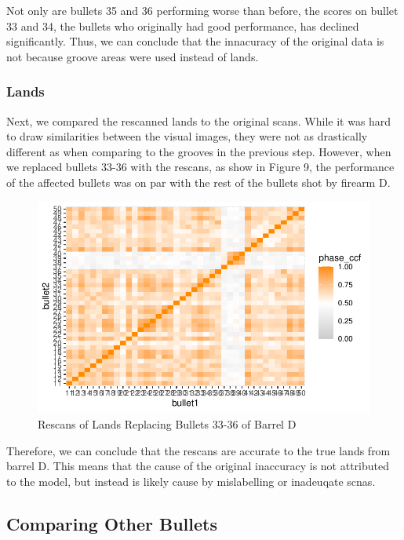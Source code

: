 \documentclass[
  number]{elsarticle}
\begin{document}
Not only are bullets 35 and 36 performing worse than before, the scores
on bullet 33 and 34, the bullets who originally had good performance,
has declined significantly. Thus, we can conclude that the innacuracy of
the original data is not because groove areas were used instead of
lands.

\hypertarget{lands}{%
\subsubsection{Lands}\label{lands}}

Next, we compared the rescanned lands to the original scans. While it
was hard to draw similarities between the visual images, they were not
as drastically different as when comparing to the grooves in the
previous step. However, when we replaced bullets 33-36 with the rescans,
as show in Figure 9, the performance of the affected bullets was on par
with the rest of the bullets shot by firearm D.

\begin{figure}[H]

{\centering \includegraphics{Interactive-Visualization-Framework_files/figure-pdf/unnamed-chunk-5-1.pdf}

}

\caption{Rescans of Lands Replacing Bullets 33-36 of Barrel D}

\end{figure}

Therefore, we can conclude that the rescans are accurate to the true
lands from barrel D. This means that the cause of the original
inaccuracy is not attributed to the model, but instead is likely cause
by mislabelling or inadeuqate scnas.

\hypertarget{comparing-other-bullets}{%
\subsection{Comparing Other Bullets}\label{comparing-other-bullets}}
\end{document}
